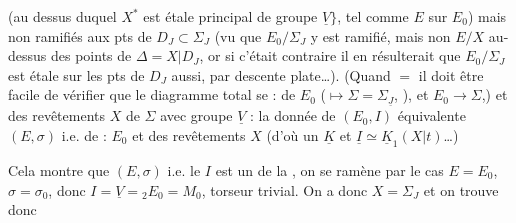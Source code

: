 \documentclass[11pt,a4paper]{article}
\begin{document}
(au dessus duquel $X^*$ est étale  principal de
groupe $\underline{V}\}$, tel comme $E$ sur $E_0$) mais non
\ill{} ramifiés aux pts de $D_J \subset \Sigma_J$
(vu que $E_0/\Sigma_J$ y est ramifié, mais non $E/X$ au-dessus des points
de $\Delta = X|D_J$, or si c'était contraire il en résulterait que
$E_0/\Sigma_J$ est étale  sur les pts de $D_J$ aussi, par
descente plate\ldots). (Quand \ill{} $=$ il doit être facile de vérifier
que le diagramme total se  :  de
$E_0$ ($\longmapsto \Sigma = \Sigma_{\underline{J}}$, ), et $E_0 \to \Sigma$,) et des revêtements
 $X$ de $\Sigma$  avec groupe
$\underline{V}$ : la donnée de $(E_0, I)$  
équivalente \ill{} $(E, \sigma)$ i.e. de  : $E_0$ et des
revêtements $X$ (d'où un  $\underline{K}$ et
$\underline{I} \simeq \underline{K}_1(X|t)$\ldots)

Cela montre que  $(E, \sigma)$ i.e. le $I$ est un
\ill{} de la \ill{} \ill{}, on se ramène par le cas $E = E_0$,
$\sigma = \sigma_0$, donc $I = \underline{V} = {}_2E_0 = M_0$, torseur
trivial. On a donc \struck{\ill{}} $X = \Sigma_J$ et on trouve donc
\end{document}

